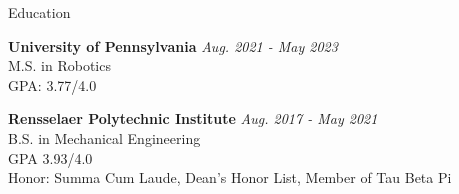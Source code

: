 \documentclass{resume} %
\begin{document}

\begin{rSection}{Education}

{\bf University of Pennsylvania} \hfill {\em Aug. 2021 - May 2023
} \\ 
M.S. in Robotics \\
GPA: 3.77/4.0

{\bf Rensselaer Polytechnic Institute} \hfill {\em Aug. 2017 - May 2021
} \\ 
B.S. in Mechanical Engineering \\
GPA 3.93/4.0 \smallskip \\
Honor: Summa Cum Laude, Dean's Honor List, Member of Tau Beta Pi

\end{rSection}

\end{document}
